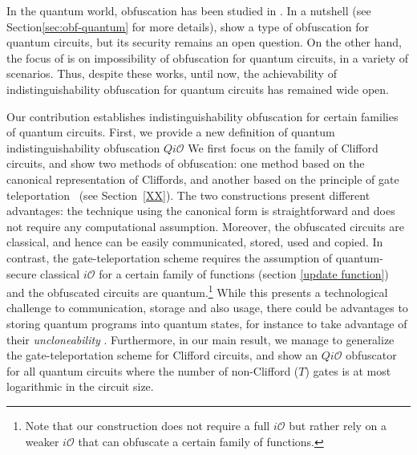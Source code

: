 In the quantum world, obfuscation has been studied in \cite{AJJ14,AF16arxiv}. In a nutshell (see Section\ref{sec:obf-quantum} for more details), \cite{AJJ14} show a type of obfuscation for quantum circuits, but its security remains an open question. On the other hand,  the focus of \cite{AF16arxiv} is on impossibility of obfuscation for quantum circuits, in a variety of scenarios. Thus, despite these works, until now, the achievability of indistinguishability obfuscation for quantum circuits has remained wide open.

Our contribution establishes indistinguishability obfuscation for certain families of quantum circuits. First, we provide a new definition of quantum indistinguishability obfuscation 
$Qi\mathcal{O}$ 
We first focus on the family of Clifford circuits, and show two methods of obfuscation: one method based on the canonical representation of Cliffords, and another based on the 
principle of gate teleportation~\cite{GC99} (see Section~\ref{XX}). The two constructions present different advantages: the technique using the canonical form is straightforward and does not require any computational assumption. Moreover, the obfuscated circuits are classical, and hence can be easily communicated, stored, used and copied.  In contrast, the gate-teleportation scheme requires the assumption of quantum-secure classical $i\mathcal{O}$ for a certain family of functions (section \ref{update function}) and the obfuscated circuits are quantum.\footnote{Note that our construction does not require a full $i\mathcal{O}$ but rather rely on a weaker $i\mathcal{O}$ that can obfuscate a certain family of functions.} While this presents a technological challenge to communication, storage and also usage, there could be advantages to storing quantum programs into quantum states, for instance to take advantage of their \emph{uncloneability} \cite{Aar09,BL19arxiv}. Furthermore, in our main result, we manage to generalize the gate-teleportation scheme for Clifford circuits, and show an $Qi\mathcal{O}$ obfuscator for all quantum circuits where the number of non-Clifford ($T$) gates is at most logarithmic in the circuit size. 


